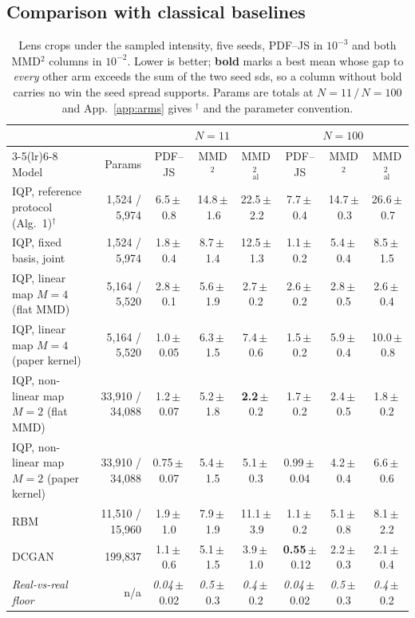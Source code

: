 \documentclass{article}
\begin{document}
\subsection{Comparison with classical baselines}
\label{sec:table}
\begin{table}[t]
\centering
\caption{Lens crops under the sampled intensity, five seeds, PDF--JS in
$10^{-3}$ and both MMD$^2$ columns in $10^{-2}$. Lower is better; \textbf{bold} marks a best mean
whose gap to \emph{every} other arm exceeds the sum of the two seed sds, so a column without bold
carries no win the seed spread supports. Params are totals at $N{=}11\,/\,N{=}100$ and
App.~\ref{app:arms} gives $^{\dagger}$ and the parameter convention.}
\label{tab:main}
\scriptsize
\setlength{\tabcolsep}{2pt}
\begin{tabular}{lrcccccc}
\toprule
& & \multicolumn{3}{c}{$N = 11$} & \multicolumn{3}{c}{$N = 100$} \\
\cmidrule(lr){3-5}\cmidrule(lr){6-8}
Model & Params & PDF--JS & MMD$^2$ & MMD$^2_{\mathrm{al}}$ & PDF--JS & MMD$^2$ & MMD$^2_{\mathrm{al}}$ \\
\midrule
IQP, reference protocol (Alg.~1)$^{\dagger}$ & 1{,}524 / 5{,}974 & 6.5\,$\pm$\,0.8 & 14.8\,$\pm$\,1.6 & 22.5\,$\pm$\,2.2 & 7.7\,$\pm$\,0.4 & 14.7\,$\pm$\,0.3 & 26.6\,$\pm$\,0.7 \\
IQP, fixed basis, joint           & 1{,}524 / 5{,}974 & 1.8\,$\pm$\,0.4 & 8.7\,$\pm$\,1.4 & 12.5\,$\pm$\,1.3 & 1.1\,$\pm$\,0.2 & 5.4\,$\pm$\,0.4 & 8.5\,$\pm$\,1.5 \\
IQP, linear map $M{=}4$ (flat MMD) & 5{,}164 / 5{,}520 & 2.8\,$\pm$\,0.1 & 5.6\,$\pm$\,1.9 & 2.7\,$\pm$\,0.2 & 2.6\,$\pm$\,0.2 & 2.8\,$\pm$\,0.5 & 2.6\,$\pm$\,0.4 \\
IQP, linear map $M{=}4$ (paper kernel) & 5{,}164 / 5{,}520 & 1.0\,$\pm$\,0.05 & 6.3\,$\pm$\,1.5 & 7.4\,$\pm$\,0.6 & 1.5\,$\pm$\,0.2 & 5.9\,$\pm$\,0.4 & 10.0\,$\pm$\,0.8 \\
IQP, non-linear map $M{=}2$ (flat MMD) & 33{,}910 / 34{,}088 & 1.2\,$\pm$\,0.07 & 5.2\,$\pm$\,1.8 & \textbf{2.2}\,$\pm$\,0.2 & 1.7\,$\pm$\,0.2 & 2.4\,$\pm$\,0.5 & 1.8\,$\pm$\,0.2 \\
IQP, non-linear map $M{=}2$ (paper kernel) & 33{,}910 / 34{,}088 & 0.75\,$\pm$\,0.07 & 5.4\,$\pm$\,1.5 & 5.1\,$\pm$\,0.3 & 0.99\,$\pm$\,0.04 & 4.2\,$\pm$\,0.4 & 6.6\,$\pm$\,0.6 \\
RBM~\cite{tieleman_2008_training}  & 11{,}510 / 15{,}960 & 1.9\,$\pm$\,1.0 & 7.9\,$\pm$\,1.9 & 11.1\,$\pm$\,3.9 & 1.1\,$\pm$\,0.2 & 5.1\,$\pm$\,0.8 & 8.1\,$\pm$\,2.2 \\
DCGAN~\cite{radford_2015_unsupervised} & 199{,}837   & 1.1\,$\pm$\,0.6 & 5.1\,$\pm$\,1.5 & 3.9\,$\pm$\,1.0 & \textbf{0.55}\,$\pm$\,0.12 & 2.2\,$\pm$\,0.3 & 2.1\,$\pm$\,0.4 \\
\midrule
\textit{Real-vs-real floor} & n/a & \textit{0.04}\,$\pm$\,0.02 & \textit{0.5}\,$\pm$\,0.3 & \textit{0.4}\,$\pm$\,0.2 & \textit{0.04}\,$\pm$\,0.02 & \textit{0.5}\,$\pm$\,0.3 & \textit{0.4}\,$\pm$\,0.2 \\
\bottomrule
\end{tabular}
\end{table}
\end{document}
